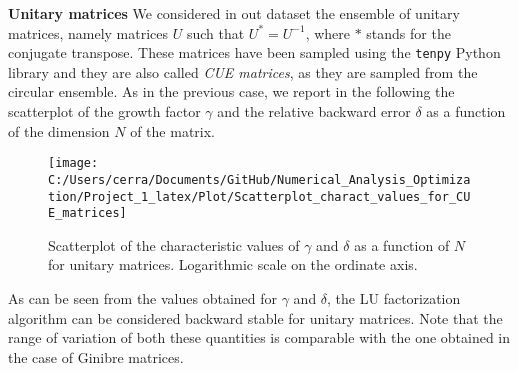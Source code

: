 \documentclass[a4paper,11pt]{report}
\begin{document}
\noindent \textbf{Unitary matrices } We considered in out dataset the ensemble of unitary matrices, namely matrices $U$ such that $U^{*} = U^{-1}$, where $*$ stands for the conjugate transpose. These matrices have been sampled using the \texttt{tenpy} Python library and they are also called \textit{CUE matrices}, as they are sampled from the circular ensemble. As in the previous case, we report in the following the scatterplot of the growth factor $\gamma$ and the relative backward error $\delta$ as a function of the dimension $N$ of the matrix.
\begin{figure}[H]
	\centering
	\texttt{[image: C:/Users/cerra/Documents/GitHub/Numerical\_Analysis\_Optimization/Project\_1\_latex/Plot/Scatterplot\_charact\_values\_for\_CUE\_matrices]}
	\caption{Scatterplot of the characteristic values of $\gamma$ and $\delta$ as a function of $N$ for unitary matrices. Logarithmic scale on the ordinate axis.}
	\label{fig:Scatterplot_CUE}
\end{figure}
\noindent As can be seen from the values obtained for $\gamma$ and $\delta$, the LU factorization algorithm can be considered backward stable for unitary matrices. Note that the range of variation of both these quantities is comparable with the one obtained in the case of Ginibre matrices.\\
%
\end{document}
